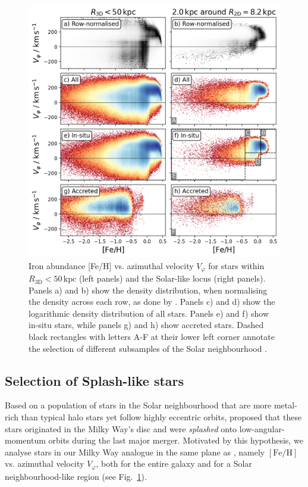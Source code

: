 \documentclass[fleqn,usenatbib]{mnras}
\begin{document}
\begin{figure}
    \centering
    \includegraphics[width=\columnwidth]{figures/splash_feh_vphi.png}
    \caption{{Iron abundance [Fe/H]} vs. azimuthal velocity $V_\varphi$ for stars within $R_\mathrm{3D} < 50\,\mathrm{kpc}$ (left panels) and the Solar-like locus (right panels). Panels a) and b) show the density distribution, when normalising the density across each row, as done by \citet[][see their Fig~1]{Belokurov2020}. Panels c) and d) show the logarithmic density distribution of all stars. Panels e) and f) show in-situ stars, while panels g) and h) show accreted stars. Dashed black rectangles with letters A-F at their lower left corner annotate the selection of different subsamples of the Solar neighbourhood \href{https://github.com/svenbuder/gse_nihaouhd/tree/main/figures}{\faGithub}.}
    \label{fig:splash_feh_vphi}
\end{figure}

\subsection{Selection of Splash-like stars}

Based on a population of stars in the Solar neighbourhood that are more metal-rich than typical halo stars yet follow highly eccentric orbits, \citet{Belokurov2020} proposed that these stars originated in the Milky Way’s disc and were \textit{splashed} onto low-angular-momentum orbits during the last major merger. Motivated by this hypothesis, we analyse stars in our Milky Way analogue in the same plane as \citet{Belokurov2020}, namely $\mathrm{[Fe/H]}$ vs. azimuthal velocity $V_\varphi$, both for the entire galaxy and for a Solar neighbourhood-like region (see Fig.~\ref{fig:splash_feh_vphi}).
\end{document}
